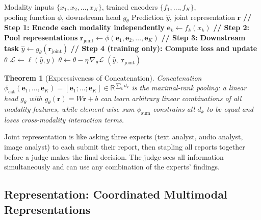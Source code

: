 \documentclass[12pt,a4paper]{article}
\theoremstyle{definition}
\theoremstyle{plain}
\newtheorem{theorem}{Theorem}[section]
\theoremstyle{remark}
\newcommand{\R}{\mathbb{R}}
\begin{document}
\begin{algorithm}[H]
\caption{Joint Multimodal Representation (Concatenation)}
\label{alg:joint_repr}
\begin{algorithmic}[1]
\Require Modality inputs $\{x_1, x_2, \ldots, x_K\}$, trained encoders $\{f_1,\ldots,f_K\}$,\\
         pooling function $\phi$, downstream head $g_\theta$
\Ensure Prediction $\hat{y}$, joint representation $\mathbf{r}$
\State \textbf{// Step 1: Encode each modality independently}
  \State $\mathbf{e}_k \gets f_k(x_k)$ 
\EndFor
\State \textbf{// Step 2: Pool representations}
\State $\mathbf{r}_{\text{joint}} \gets \phi(\mathbf{e}_1, \mathbf{e}_2, \ldots, \mathbf{e}_K)$
  \Comment{e.g., concat: $\mathbf{r} \in \R^{\sum_k d_k}$}
\State \textbf{// Step 3: Downstream task}
\State $\hat{y} \gets g_\theta(\mathbf{r}_{\text{joint}})$
\State \textbf{// Step 4 (training only): Compute loss and update $\theta$}
  \State $\mathcal{L} \gets \ell(\hat{y}, y)$ 
  \State $\theta \gets \theta - \eta\,\nabla_\theta \mathcal{L}$
\EndIf
\State \Return $(\hat{y},\; \mathbf{r}_{\text{joint}})$
\end{algorithmic}
\end{algorithm}

\begin{theorem}[Expressiveness of Concatenation]
Concatenation $\phi_{\text{cat}}(\mathbf{e}_1,\ldots,\mathbf{e}_K) = [\mathbf{e}_1;\ldots;\mathbf{e}_K] \in \R^{\sum_k d_k}$ is the maximal-rank pooling: a linear head $g_\theta$ with $g_\theta(\mathbf{r}) = W\mathbf{r} + b$ can learn arbitrary linear combinations of all modality features, while element-wise sum $\phi_{\text{sum}}$ constrains all $d_k$ to be equal and loses cross-modality interaction terms.
\end{theorem}

\begin{tcolorbox}[laymanbox]
Joint representation is like asking three experts (text analyst, audio analyst, image analyst) to each submit their report, then stapling all reports together before a judge makes the final decision. The judge sees all information simultaneously and can use any combination of the experts' findings.
\end{tcolorbox}

\subsection{Representation: Coordinated Multimodal Representations}
\end{document}

